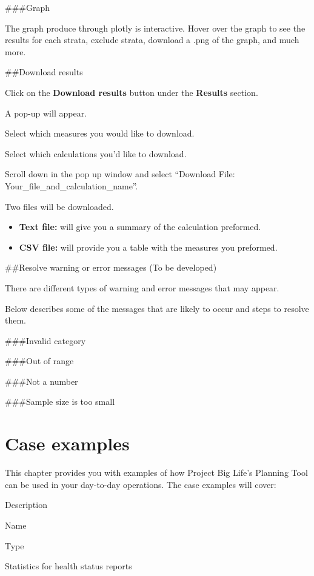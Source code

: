 \documentclass[]{book}
\providecommand{\tightlist}{%
  \setlength{\itemsep}{0pt}\setlength{\parskip}{0pt}}
\begin{document}
\#\#\#Graph

The graph produce through plotly is interactive. Hover over the graph to see the results for each strata, exclude strata, download a .png of the graph, and much more.

\#\#Download results

Click on the \textbf{Download results} button under the \textbf{Results} section.

A pop-up will appear.

Select which measures you would like to download.

Select which calculations you'd like to download.

Scroll down in the pop up window and select ``Download File: Your\_file\_and\_calculation\_name''.

Two files will be downloaded.

\begin{itemize}
\tightlist
\item
  \textbf{Text file:} will give you a summary of the calculation preformed.
\item
  \textbf{CSV file:} will provide you a table with the measures you preformed.
\end{itemize}

\#\#Resolve warning or error messages (To be developed)

There are different types of warning and error messages that may appear.

Below describes some of the messages that are likely to occur and steps to resolve them.

\#\#\#Invalid category

\#\#\#Out of range

\#\#\#Not a number

\#\#\#Sample size is too small

\hypertarget{caseexamples}{%
\chapter{Case examples}\label{caseexamples}}

This chapter provides you with examples of how Project Big Life's Planning Tool can be used in your day-to-day operations. The case examples will cover:

Description

Name

Type

Statistics for health status reports
\end{document}
